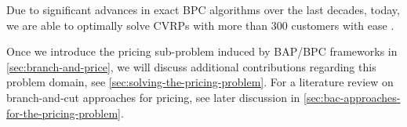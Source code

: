Due to significant advances in exact BPC algorithms over the last decades,
today,
we are able to optimally solve CVRPs with more than $300$ customers with ease \parencite{costa2019}.

\medskip

Once we introduce the pricing sub-problem induced by BAP/BPC frameworks
in \cref{sec:branch-and-price},
we will discuss additional contributions regarding this problem domain,
see \cref{sec:solving-the-pricing-problem}.
For a literature review on branch-and-cut approaches for pricing, see later discussion
in \cref{sec:bac-approaches-for-the-pricing-problem}.
